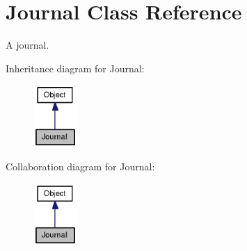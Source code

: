 \hypertarget{class_journal}{
\section{Journal Class Reference}
\label{class_journal}
}
A journal.  


Inheritance diagram for Journal:\nopagebreak
\begin{figure}[H]
\begin{center}
\leavevmode
\includegraphics[width=47pt]{class_journal__inherit__graph}
\end{center}
\end{figure}
Collaboration diagram for Journal:\nopagebreak
\begin{figure}[H]
\begin{center}
\leavevmode
\includegraphics[width=47pt]{class_journal__coll__graph}
\end{center}
\end{figure}
